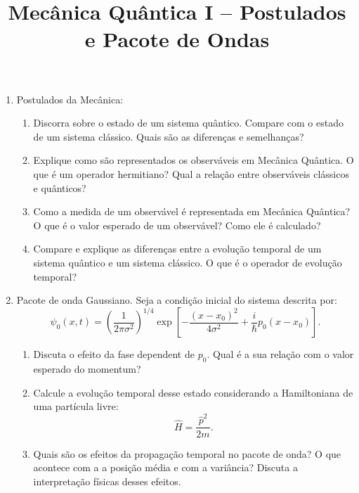 \newif\ifuseseminar
\useseminartrue


\title{Mecânica Quântica I -- Postulados e Pacote de Ondas}


\begin{enumerate}
      \item Postulados da Mecânica:
            \begin{enumerate}
                  \item Discorra sobre o estado de um sistema quântico. Compare com o
                        estado de um sistema clássico. Quais são as diferenças e
                        semelhanças?
                  \item Explique como são representados os observáveis em Mecânica
                        Quântica. O que é um operador hermitiano? Qual a relação entre
                        observáveis clássicos e quânticos?
                  \item Como a medida de um observável é representada em Mecânica
                        Quântica? O que é o valor esperado de um observável? Como ele é
                        calculado?
                  \item Compare e explique as diferenças entre a evolução temporal de um
                        sistema quântico e um sistema clássico. O que é o operador de
                        evolução temporal?
            \end{enumerate}
      \item Pacote de onda Gaussiano. Seja a condição inicial do sistema descrita por:
            \begin{equation}
                  \psi_0(x, t) = \left(\frac{1}{2\pi \sigma^2}\right)^{1/4}
                  \exp\left[-\frac{(x - x_0)^2}{4\sigma^2} + \frac{i}{\hbar}p_0(x - x_0)\right].
            \end{equation}
            \begin{enumerate}
                  \item Discuta o efeito da fase dependent de $p_0$. Qual é a sua
                        relação com o valor esperado do momentum?
                  \item Calcule a evolução temporal desse estado considerando a
                        Hamiltoniana de uma partícula livre:
                        \begin{equation}
                              \hat{H} = \frac{\hat{p}^2}{2m}.
                        \end{equation}
                  \item Quais são os efeitos da propagação temporal no pacote de onda? O
                        que acontece com a a posição média e com a variância? Discuta
                        a interpretação físicas desses efeitos.
            \end{enumerate}
\end{enumerate}



